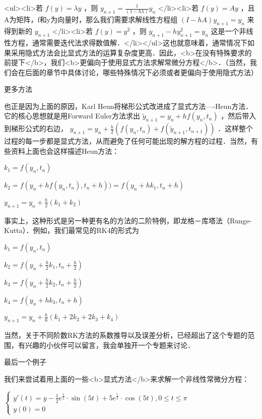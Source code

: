 <ul><li>若  $f(y)=\lambda y$  ，则  $y_{n+1}=\frac{1}{(1-h\lambda)}y_n$  </li><li>若  $f(y)=A y$  ，且A为矩阵，f和y为向量时，那么我们需要求解线性方程组  $(I-hA)y_{n+1}=y_n$  来得到新的  $y_{n+1}$  </li><li>若  $f(y)=y^2$  ，则  $y_{n+1}-hy^2_{n+1} = y_n$ 这是一个非线性方程，通常需要迭代法求得数值解．</li></ul>这也就意味着，通常情况下如果采用隐式方法会比显式方法的运算复杂度更高．因此，<b>在没有特殊要求的前提下</b>，我们<b>更偏向于使用显式方法求解常微分方程</b>．（当然，我们会在后面的章节中具体讨论，哪些特殊情况下必须或者更偏向于使用隐式方法）



更多方法

也正是因为上面的原因，Karl Heun将梯形公式改进成了显式方法----Heun方法．它的核心思想就是用Forward Euler方法求出  $\tilde{y}_{n+1}=y_n+hf(y_n,t_n)$ ，然后带入到梯形公式的右边，  $y_{n+1}=y_n+\frac{h}{2}\left(f(y_n,t_n)+f(\tilde{y}_{n+1},t_{n+1}) \right)$ ．这样整个过程的每一步都是显式方法，从而避免了任何可能出现的解方程的过程．当然，有些资料上面也会这样描述Heun方法：

 $k_1=f(y_n,t_n)$  

 $k_2=f(y_n+hf(y_n,t_n),t_n+h))=f(y_n+hk_1,t_n+h)$  

 $y_{n+1}=y_n+\frac{h}{2}(k_1+k_2)$  

事实上，这种形式是另一种更有名的方法的二阶特例，即龙格－库塔法（Runge-Kutta）．例如，我们最常见的RK4的形式为

 $k_1=f(y_n,t_n)$  

 $k_2=f\left(y_n+\frac{h}{2}k_1, t_n+\frac{h}{2}\right)$  

 $k_3=f\left(y_n+\frac{h}{2}k_2, t_n+\frac{h}{2}\right)$  

 $k_4=f\left(y_n+hk_3, t_n+h\right)$  

 $y_{n+1}=y_{n}+\frac{h}{6}(k_1+2k_2+2k_3+k_4)$  

当然，关于不同阶数RK方法的系数推导以及误差分析，已经超出了这个专题的范围，有兴趣的小伙伴可以留言，我会单独开一个专题来讨论．



最后一个例子

我们来尝试着用上面的一些<b>显式方法</b>来求解一个非线性常微分方程：

 $\begin{equation}     \begin{cases}     y'(t) = y-\frac{1}{2}e^{\frac{t}{2}}\cdot\sin(5t)+5e^{\frac{t}{2}}\cdot\cos(5t), 0\le t\le \pi\\     y(0)=0     \end{cases} \end{equation}$  

